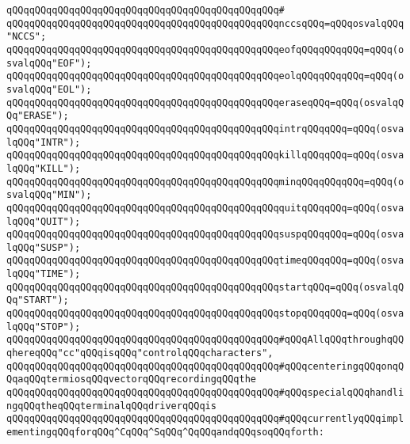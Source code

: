 \verb|qQQqqQQqqQQqqQQqqQQqqQQqqQQqqQQqqQQqqQQqqQQqqQQq#|\newline
\verb|qQQqqQQqqQQqqQQqqQQqqQQqqQQqqQQqqQQqqQQqqQQqqQQqnccsqQQq=qQQqosvalqQQq"NCCS";|\newline
\newline
\verb|qQQqqQQqqQQqqQQqqQQqqQQqqQQqqQQqqQQqqQQqqQQqqQQqeofqQQqqQQqqQQq=qQQq(osvalqQQq"EOF");|\newline
\verb|qQQqqQQqqQQqqQQqqQQqqQQqqQQqqQQqqQQqqQQqqQQqqQQqeolqQQqqQQqqQQq=qQQq(osvalqQQq"EOL");|\newline
\verb|qQQqqQQqqQQqqQQqqQQqqQQqqQQqqQQqqQQqqQQqqQQqqQQqeraseqQQq=qQQq(osvalqQQq"ERASE");|\newline
\verb|qQQqqQQqqQQqqQQqqQQqqQQqqQQqqQQqqQQqqQQqqQQqqQQqintrqQQqqQQq=qQQq(osvalqQQq"INTR");|\newline
\verb|qQQqqQQqqQQqqQQqqQQqqQQqqQQqqQQqqQQqqQQqqQQqqQQqkillqQQqqQQq=qQQq(osvalqQQq"KILL");|\newline
\verb|qQQqqQQqqQQqqQQqqQQqqQQqqQQqqQQqqQQqqQQqqQQqqQQqminqQQqqQQqqQQq=qQQq(osvalqQQq"MIN");|\newline
\verb|qQQqqQQqqQQqqQQqqQQqqQQqqQQqqQQqqQQqqQQqqQQqqQQqquitqQQqqQQq=qQQq(osvalqQQq"QUIT");|\newline
\verb|qQQqqQQqqQQqqQQqqQQqqQQqqQQqqQQqqQQqqQQqqQQqqQQqsuspqQQqqQQq=qQQq(osvalqQQq"SUSP");|\newline
\verb|qQQqqQQqqQQqqQQqqQQqqQQqqQQqqQQqqQQqqQQqqQQqqQQqtimeqQQqqQQq=qQQq(osvalqQQq"TIME");|\newline
\verb|qQQqqQQqqQQqqQQqqQQqqQQqqQQqqQQqqQQqqQQqqQQqqQQqstartqQQq=qQQq(osvalqQQq"START");|\newline
\verb|qQQqqQQqqQQqqQQqqQQqqQQqqQQqqQQqqQQqqQQqqQQqqQQqstopqQQqqQQq=qQQq(osvalqQQq"STOP");|\newline
\newline
\verb|qQQqqQQqqQQqqQQqqQQqqQQqqQQqqQQqqQQqqQQqqQQqqQQq#qQQqAllqQQqthroughqQQqhereqQQq"cc"qQQqisqQQq"controlqQQqcharacters",|\newline
\verb|qQQqqQQqqQQqqQQqqQQqqQQqqQQqqQQqqQQqqQQqqQQqqQQq#qQQqcenteringqQQqonqQQqaqQQqtermiosqQQqvectorqQQqrecordingqQQqthe|\newline
\verb|qQQqqQQqqQQqqQQqqQQqqQQqqQQqqQQqqQQqqQQqqQQqqQQq#qQQqspecialqQQqhandlingqQQqtheqQQqterminalqQQqdriverqQQqis|\newline
\verb|qQQqqQQqqQQqqQQqqQQqqQQqqQQqqQQqqQQqqQQqqQQqqQQq#qQQqcurrentlyqQQqimplementingqQQqforqQQq^CqQQq^SqQQq^QqQQqandqQQqsoqQQqforth:|\newline
\newline
